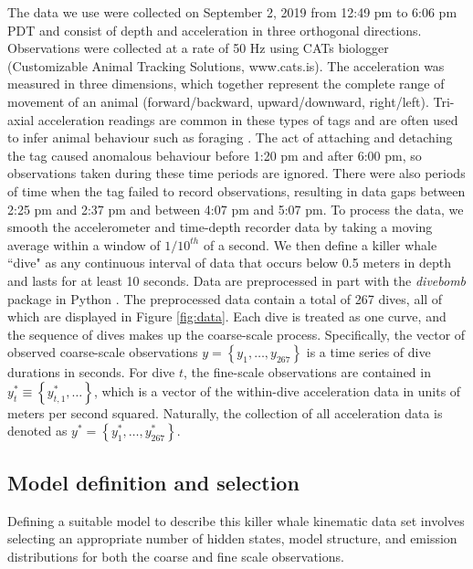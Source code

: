 The data we use were collected on September 2, 2019 from 12:49 pm to 6:06 pm PDT and consist of depth and acceleration in three orthogonal directions. Observations were collected at a rate of 50 Hz using CATs biologger (Customizable Animal Tracking Solutions, www.cats.is). The acceleration was measured in three dimensions, which together represent the complete range of movement of an animal (forward/backward, upward/downward, right/left). Tri-axial acceleration readings are common in these types of tags and are often used to infer animal behaviour such as foraging \citep{Cade:2017,Fehlmann:2017,Wright:2017}. The act of attaching and detaching the tag caused anomalous behaviour before 1:20 pm and after 6:00 pm, so observations taken during these time periods are ignored. There were also periods of time when the tag failed to record observations, resulting in data gaps between 2:25 pm and 2:37 pm and between 4:07 pm and 5:07 pm. To process the data, we smooth the accelerometer and time-depth recorder data by taking a moving average within a window of $1/10^{th}$ of a second. We then define a killer whale ``dive" as any continuous interval of data that occurs below 0.5 meters in depth and lasts for at least 10 seconds. Data are preprocessed in part with the \textit{divebomb} package in Python \citep{Nunes:2018}. The preprocessed data contain a total of 267 dives, all of which are displayed in Figure \ref{fig:data}. Each dive is treated as one curve, and the sequence of dives makes up the coarse-scale process. Specifically, the vector of observed coarse-scale observations $y = \left\{y_1,\ldots,y_{267}\right\}$ is a time series of dive durations in seconds. For dive $t$, the fine-scale observations are contained in $y^*_{t} \equiv \left\{y^*_{t,1},\ldots \right\}$, which is a vector of the within-dive acceleration data in units of meters per second squared. Naturally, the collection of all acceleration data is denoted as $y^* = \left\{y^*_1,\ldots,y^*_{267}\right\}$.

\subsection{Model definition and selection}
\label{subsec:model_selection}

Defining a suitable model to describe this killer whale kinematic data set involves selecting an appropriate number of hidden states, model structure, and emission distributions for both the coarse and fine scale observations.

